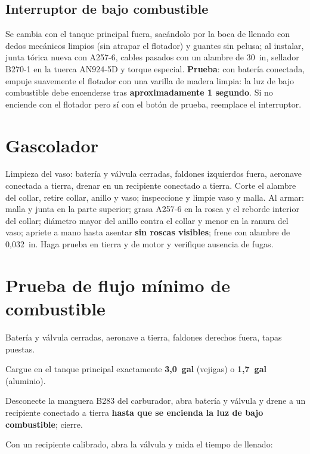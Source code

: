 \subsection{Interruptor de bajo combustible}

Se cambia con el tanque principal fuera, sacándolo por la boca de llenado con dedos mecánicos limpios (sin atrapar el flotador) y guantes sin pelusa; al instalar, junta tórica nueva con A257-6, cables pasados con un alambre de 30~in, sellador B270-1 en la tuerca AN924-5D y torque especial. \textbf{Prueba}: con batería conectada, empuje suavemente el flotador con una varilla de madera limpia: la luz de bajo combustible debe encenderse tras \textbf{aproximadamente 1 segundo}. Si no enciende con el flotador pero sí con el botón de prueba, reemplace el interruptor.

\section{Gascolador}

Limpieza del vaso: batería y válvula cerradas, faldones izquierdos fuera, aeronave conectada a tierra, drenar en un recipiente conectado a tierra. Corte el alambre del collar, retire collar, anillo y vaso; inspeccione y limpie vaso y malla. Al armar: malla y junta en la parte superior; grasa A257-6 en la rosca y el reborde interior del collar; diámetro mayor del anillo contra el collar y menor en la ranura del vaso; apriete a mano hasta asentar \textbf{sin roscas visibles}; frene con alambre de 0,032~in. Haga prueba en tierra y de motor y verifique ausencia de fugas.

\section{Prueba de flujo mínimo de combustible}

\begin{pasos}
\item Batería y válvula cerradas, aeronave a tierra, faldones derechos fuera, tapas puestas.
\item Cargue en el tanque principal exactamente \textbf{3,0~gal} (vejigas) o \textbf{1,7~gal} (aluminio).
\item Desconecte la manguera B283 del carburador, abra batería y válvula y drene a un recipiente conectado a tierra \textbf{hasta que se encienda la luz de bajo combustible}; cierre.
\item Con un recipiente calibrado, abra la válvula y mida el tiempo de llenado:
\end{pasos}

